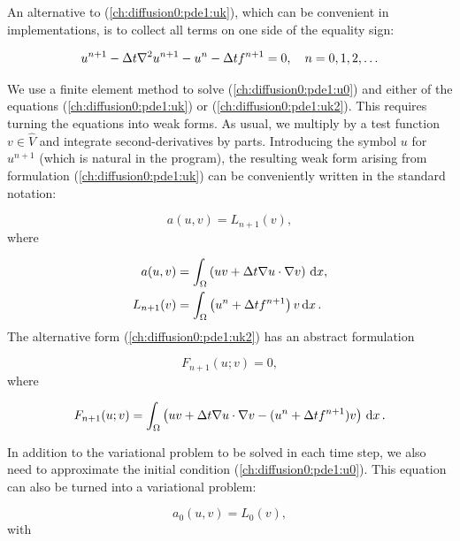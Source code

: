 \documentclass[graybox,envcountchap,sectrefs,final]{svmonodo}
\begin{document}
An alternative to (\ref{ch:diffusion0:pde1:uk}), which can be
convenient in implementations, is to collect
all terms on one side of the equality sign:

\begin{equation}
u^{n+1} - {\dt}\nabla^2 u^{n+1} -  u^{n} - {\dt} f^{n+1} = 0,\quad n=0,1,2,\ldots
\label{ch:diffusion0:pde1:uk2}
\end{equation}

We use a finite element method to solve
(\ref{ch:diffusion0:pde1:u0}) and either of the equations
(\ref{ch:diffusion0:pde1:uk}) or (\ref{ch:diffusion0:pde1:uk2}).  This
requires turning the equations into weak forms.  As usual, we multiply
by a test function $v\in \hat V$ and integrate second-derivatives by
parts. Introducing the symbol $u$ for $u^{n+1}$ (which is natural in the
program), the resulting weak form arising from
formulation (\ref{ch:diffusion0:pde1:uk})
can be conveniently written in
the standard notation:

\[ a(u,v)=L_{n+1}(v),\]
where

\begin{align}
a(u,v) &= \int_\Omega\left(uv + {\dt}
\nabla u\cdot \nabla v\right) \dx, \label{ch:diffusion0:pde1:a}\\
L_{n+1}(v) &= \int_\Omega \left(u^n + {\dt}  f^{n+1}\right)v \dx\tp
\label{ch:diffusion0:pde1:L}
\end{align}
The alternative form (\ref{ch:diffusion0:pde1:uk2}) has an
abstract formulation

\[ F_{n+1}(u;v) = 0,\]
where

\begin{equation}
F_{n+1}(u; v) = \int_\Omega \left(uv + {\dt}
\nabla u\cdot \nabla v -
(u^n + {\dt} f^{n+1})v\right) \dx\tp
\label{ch:diffusion0:pde1:F}
\end{equation}

In addition to the variational problem to be solved in each time step,
we also need to approximate the initial condition
(\ref{ch:diffusion0:pde1:u0}). This equation can also be turned into a
variational problem:

\[ a_0(u,v)=L_0(v),\]
with
\end{document}
